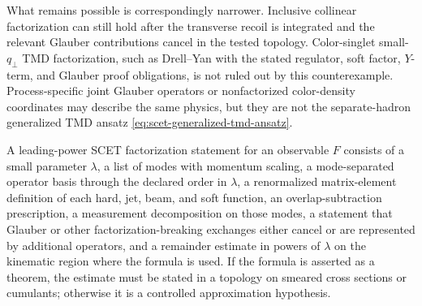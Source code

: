 \begin{controlledapproximation}
What remains possible is correspondingly narrower.  Inclusive collinear
factorization can still hold after the transverse recoil is integrated and
the relevant Glauber contributions cancel in the tested topology.
Color-singlet small-\(q_\perp\) TMD factorization, such as Drell--Yan with
the stated regulator, soft factor, \(Y\)-term, and Glauber proof obligations,
is not ruled out by this counterexample.  Process-specific joint Glauber
operators or nonfactorized color-density coordinates may describe the same
physics, but they are not the separate-hadron generalized TMD ansatz
\eqref{eq:scet-generalized-tmd-ansatz}.
\end{controlledapproximation}

\begin{hypothesis}
\label{hyp:leading-power-scet-factorization}
A leading-power SCET factorization statement for an observable \(F\) consists
of a small parameter \(\lambda\), a list of modes with momentum scaling, a
mode-separated operator basis through the declared order in \(\lambda\), a
renormalized matrix-element definition of each hard, jet, beam, and soft
function, an overlap-subtraction prescription, a measurement decomposition on
those modes, a statement that Glauber or other factorization-breaking exchanges
either cancel or are represented by additional operators, and a remainder
estimate in powers of \(\lambda\) on the kinematic region where the formula is
used.  If the formula is asserted as a theorem, the estimate must be stated in
a topology on smeared cross sections or cumulants; otherwise it is a
controlled approximation hypothesis.
\end{hypothesis}

